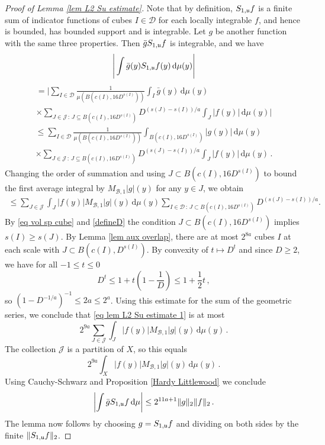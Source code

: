 {\begin{proof}[Proof of Lemma \ref{lem L2 Su estimate}]
    Note that by definition, $S_{1,\mathfrak u}f$ is a finite sum of indicator functions of cubes $I \in \mathcal{D}$ for each locally integrable $f$, and hence is bounded, has bounded support and is integrable. Let $g$ be another function with the same three properties. Then $\bar g S_{1,\mathfrak u}f$ is integrable, and we have
    $$
        \Bigg|\int \bar g(y) S_{1,\mathfrak u}f(y) \, \mathrm{d}\mu(y)\Bigg|
    $$
    \begin{multline*}
        = \Bigg|\sum_{I\in\mathcal{D}} \frac{1}{\mu(B(c(I), 16 D^{s(I)}))} \int_I \bar g(y) \, \mathrm{d}\mu(y)\\
        \times \sum_{J\in \mathcal{J}\,:\,J\subseteq B(c(I), 16 D^{s(I)})} D^{(s(J)-s(I))/a}\int_J |f(y)| \,\mathrm{d}\mu(y)\Bigg|
    \end{multline*}
    \begin{multline*}
        \le \sum_{I\in\mathcal{D}} \frac{1}{\mu(B(c(I), 16D^{s(I)}))} \int_{B(c(I), 16D^{s(I)})} | g(y)| \, \mathrm{d}\mu(y)\\ \times \sum_{J\in \mathcal{J}\,:\,J\subseteq B(c(I), 16 D^{s(I)})} D^{(s(J)-s(I))/a}\int_J |f(y)| \,\mathrm{d}\mu(y)\,.
    \end{multline*}
    Changing the order of summation and using $J \subset B(c(I), 16 D^{s(I)})$ to bound the first average integral by $M_{\mathcal{B},1}|g|(y)$ for any $y \in J$, we obtain
    \begin{align}
    \label{eq lem L2 Su estimate 1}
        \le \sum_{J\in\mathcal{J}}\int_J|f(y)|  M_{\mathcal{B},1}|g|(y) \, \mathrm{d}\mu(y) \sum_{I \in \mathcal{D} \, : \, J\subset B(c(I),16 D^{s(I)})} D^{(s(J)-s(I))/a}.
    \end{align}
    By \eqref{eq vol sp cube} and \eqref{defineD} the condition $J \subset B(c(I), 16 D^{s(I)})$ implies $s(I) \ge s(J)$. By Lemma \ref{lem aux overlap}, there are at most $2^{8a}$ cubes $I$ at each scale with $J \subset B(c(I), D^{s(I)})$.
    By convexity of $t \mapsto D^t$ and since $D \ge 2$, we have for all $-1 \le t \le 0$
    $$
        D^t \le 1 + t\left(1 - \frac{1}{D}\right) \le 1 + \frac{1}{2}t\,,
    $$
    so $(1 - D^{-1/a})^{-1} \le 2a \le 2^a$.
    Using this estimate for the sum of the geometric series,
    we conclude that \eqref{eq lem L2 Su estimate 1} is at most
    $$
        2^{9a} \sum_{J\in\mathcal{J}}\int_J|f(y)|  M_{\mathcal{B},1}|g|(y) \, \mathrm{d}\mu(y)\,.
    $$
    The collection $\mathcal{J}$ is a partition of $X$, so this equals
    $$
        2^{9a} \int_X|f(y)|  M_{\mathcal{B},1}|g|(y) \, \mathrm{d}\mu(y)\,.
    $$
    Using Cauchy-Schwarz and Proposition \ref{Hardy Littlewood} we conclude
    $$
        \left|\int \bar g S_{1,\mathfrak u}f \, \mathrm{d}\mu \right| \le  2^{11a+1} \|g\|_2\|f\|_2\,.
    $$
    The lemma now follows by choosing $g = S_{1,\mathfrak u}f$ and dividing on both sides by the finite $\|S_{1,\mathfrak u}f\|_2$.
\end{proof}

}
